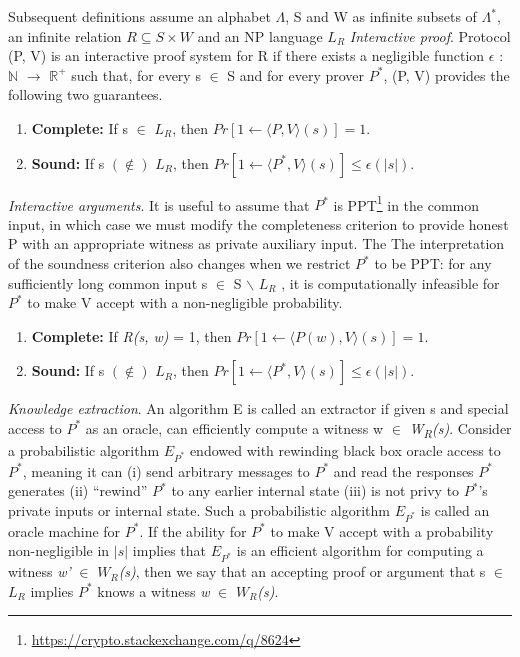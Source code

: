 \documentclass[a4paper]{article}
\newcommand{\quotes}[1]{``#1''}
\begin{document}
\newline
Subsequent definitions assume an alphabet \(\Lambda\), S and W as infinite subsets of \(\Lambda^{*}\), an infinite relation $R \subseteq S \times W$ and an NP language \textit{$L_R$} 
\newline
\newline
\textit{Interactive proof}. Protocol (P, V) is an interactive proof system for R if there exists a negligible function \(\epsilon\) : $\mathbb{N}$ \(\to\) $\mathbb{R}^{+}$ such that, for every s $\in$ S and for every prover \textit{$P^{*}$}, (P, V) provides the following two guarantees.
\begin{enumerate}
  \item \textbf{Complete:}  If s $\in$ \textit{$L_R$}, then $Pr[1 \gets \langle P, V \rangle (s)] = 1$.
  \item \textbf{Sound:}  If s $(\notin)$ \textit{$L_R$}, then $Pr[1 \gets \langle P^{*}, V \rangle (s)] \le \epsilon(|s|)$.
\end{enumerate}
\textit{Interactive arguments}. It is useful to assume that \textit{$P^{*}$} is PPT\footnote{\url{https://crypto.stackexchange.com/q/8624}} in the common input, in which case we must modify the completeness criterion to provide honest P with an appropriate witness as private auxiliary input. The The interpretation of the soundness criterion also changes when we restrict \textit{$P^{*}$} to be PPT: for any sufficiently long common input s $\in$ S \ensuremath{\backslash} \textit{$L_R$} , it is computationally infeasible for \textit{$P^{*}$} to make V accept with a non-negligible probability.
\begin{enumerate}
  \item \textbf{Complete:}  If \textit{R(s, w)} = 1, then $Pr[1 \gets \langle P(w), V \rangle (s)] = 1$.
  \item \textbf{Sound:}  If s $(\notin)$ \textit{$L_R$}, then $Pr[1 \gets \langle P^{*}, V \rangle (s)] \le \epsilon(|s|)$.
\end{enumerate}
\textit{Knowledge extraction}. An algorithm E is called an extractor if given s and special access to \textit{$P^{*}$} as an oracle, can efficiently compute a witness w $\in$ \textit{W\textsubscript{R}(s)}. Consider a probabilistic algorithm $E_{P^{*}}$ endowed with rewinding black box oracle access to \textit{$P^{*}$}, meaning it can (i) send arbitrary messages to \textit{$P^{*}$} and read the responses \textit{$P^{*}$} generates  (ii) \quotes{rewind} \textit{$P^{*}$} to any earlier internal state (iii) is not privy to \textit{$P^{*}$}’s private inputs or internal state. Such a probabilistic algorithm $E_{P^{*}}$ is called an oracle machine for \textit{$P^{*}$}. If the ability for \textit{$P^{*}$} to make V accept with a probability non-negligible in $|s|$ implies that $E_{P^{*}}$ is an efficient algorithm for computing a witness \textit{w'} $\in$ \textit{$W_R$(s)}, then we say that an accepting proof or argument that s $\in$ \textit{$L_R$} implies \textit{$P^{*}$} knows a witness \textit{w} $\in$ \textit{$W_R$(s)}.
\end{document}
